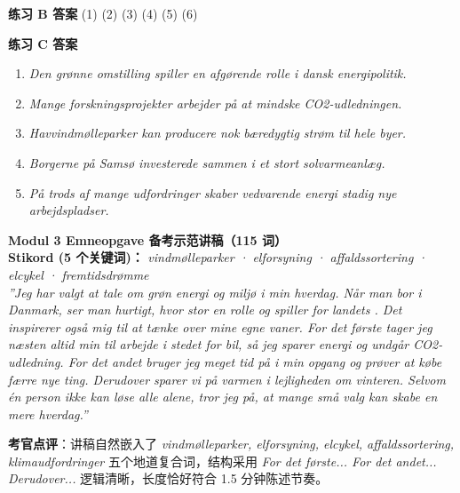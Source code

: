 \begin{answerbox}
\textbf{练习 B 答案}
(1)  \quad (2)  \quad (3)  \quad (4)  \quad (5)  \quad (6) 

\textbf{练习 C 答案}
\begin{enumerate}
  \item \textit{Den grønne omstilling spiller en afgørende rolle i dansk energipolitik.}
  \item \textit{Mange forskningsprojekter arbejder på at mindske CO2-udledningen.}
  \item \textit{Havvindmølleparker kan producere nok bæredygtig strøm til hele byer.}
  \item \textit{Borgerne på Samsø investerede sammen i et stort solvarmeanlæg.}
  \item \textit{På trods af mange udfordringer skaber vedvarende energi stadig nye arbejdspladser.}
\end{enumerate}

\textbf{Modul 3 Emneopgave 备考示范讲稿（115 词）}\\
\textbf{Stikord (5 个关键词)：} \textit{vindmølleparker · elforsyning · affaldssortering · elcykel · fremtidsdrømme}\\[3pt]
\textit{”Jeg har valgt at tale om grøn energi og miljø i min hverdag. Når man bor i Danmark, ser man hurtigt, hvor stor en rolle  og  spiller for landets . Det inspirerer også mig til at tænke over mine egne vaner. For det første tager jeg næsten altid min  til arbejde i stedet for bil, så jeg sparer energi og undgår CO2-udledning. For det andet bruger jeg meget tid på  i min opgang og prøver at købe færre nye ting. Derudover sparer vi på varmen i lejligheden om vinteren. Selvom én person ikke kan løse alle  alene, tror jeg på, at mange små valg kan skabe en mere  hverdag.”}

\small\textbf{考官点评}：讲稿自然嵌入了 \textit{vindmølleparker, elforsyning, elcykel, affaldssortering, klimaudfordringer} 五个地道复合词，结构采用 \textit{For det første... For det andet... Derudover...} 逻辑清晰，长度恰好符合 1.5 分钟陈述节奏。
\end{answerbox}
